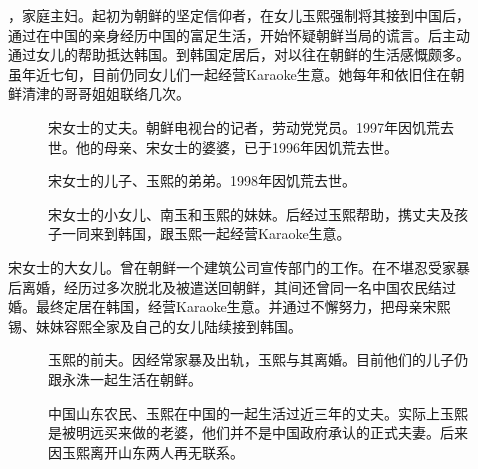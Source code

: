 \begin{description}
	\item[] ，家庭主妇。起初为朝鲜的坚定信仰者，在女儿玉熙强制将其接到中国后，通过在中国的亲身经历中国的富足生活，开始怀疑朝鲜当局的谎言。后主动通过女儿的帮助抵达韩国。到韩国定居后，对以往在朝鲜的生活感慨颇多。虽年近七旬，目前仍同女儿们一起经营Karaoke生意。她每年和依旧住在朝鲜清津的哥哥姐姐联络几次。
		{\footnotesize \begin{description}
			\item[] 宋女士的丈夫。朝鲜电视台的记者，劳动党党员。1997年因饥荒去世。他的母亲、宋女士的婆婆，已于1996年因饥荒去世。
			\item[] 宋女士的儿子、玉熙的弟弟。1998年因饥荒去世。
			\item[] 宋女士的小女儿、南玉和玉熙的妹妹。后经过玉熙帮助，携丈夫及孩子一同来到韩国，跟玉熙一起经营Karaoke生意。
		\end{description}}
		
	\item[] 宋女士的大女儿。曾在朝鲜一个建筑公司宣传部门的工作。在不堪忍受家暴后离婚，经历过多次脱北及被遣送回朝鲜，其间还曾同一名中国农民结过婚。最终定居在韩国，经营Karaoke生意。并通过不懈努力，把母亲宋熙锡、妹妹容熙全家及自己的女儿陆续接到韩国。
		{\footnotesize \begin{description}
			\item[] 玉熙的前夫。因经常家暴及出轨，玉熙与其离婚。目前他们的儿子仍跟永洙一起生活在朝鲜。
			\item[] 中国山东农民、玉熙在中国的一起生活过近三年的丈夫。实际上玉熙是被明远买来做的老婆，他们并不是中国政府承认的正式夫妻。后来因玉熙离开山东两人再无联系。
		\end{description}}


\end{description}

